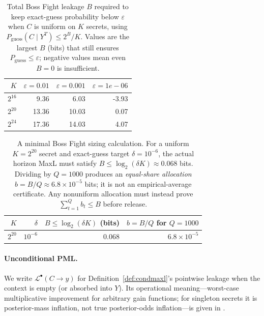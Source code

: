 \documentclass[11pt]{article}
\newcommand{\PML}{\mathcal{L}^{\bullet}}
\newcommand{\logtwo}{\log_2}
\begin{document}
\begin{table}[t]
\centering
\caption{Total Boss Fight leakage $B$ required to keep exact-guess probability below $\varepsilon$ when $C$ is uniform on $K$ secrets, using $P_{\mathrm{guess}}(C\mid Y^{T})\le 2^{B}/K$. Values are the largest $B$ (bits) that still ensures $P_{\mathrm{guess}}\le \varepsilon$; negative values mean even $B=0$ is insufficient.}
\label{tab:identification-targets}
\begin{tabular}{r r r r}
\toprule
$K$ & $\varepsilon=0.01$ & $\varepsilon=0.001$ & $\varepsilon=1e-06$\\
\midrule
$2^{16}$ & 9.36 & 6.03 & -3.93 \\
$2^{20}$ & 13.36 & 10.03 & 0.07 \\
$2^{24}$ & 17.36 & 14.03 & 4.07 \\
\bottomrule
\end{tabular}
\end{table}


\begin{table}[t]
\centering
\caption{A minimal Boss Fight sizing calculation. For a uniform $K=2^{20}$ secret and exact-guess target $\delta=10^{-6}$, the actual horizon MaxL must satisfy $B\le \logtwo(\delta K)\approx 0.068$ bits. Dividing by $Q=1000$ produces an \emph{equal-share allocation} $b=B/Q\approx 6.8\times 10^{-5}$ bits; it is not an empirical-average certificate. Any nonuniform allocation must instead prove $\sum_{t=1}^{Q} b_t\le B$ before release.}
\label{tab:window-example}
\begin{tabular}{rrrr}
\toprule
$K$ & $\delta$ & $B\le \logtwo(\delta K)$ (bits) & $b=B/Q$ for $Q{=}1000$ \\
\midrule
$2^{20}$ & $10^{-6}$ & $0.068$ & $6.8\times 10^{-5}$ \\
\bottomrule
\end{tabular}
\end{table}




\paragraph{Unconditional PML.}
We write $\PML(C\!\to\!y)$ for Definition~\ref{def:condmaxl}'s pointwise leakage when the context is empty (or absorbed into $Y$). Its operational meaning---worst-case multiplicative improvement for arbitrary gain functions; for singleton secrets it is posterior-mass inflation, not true posterior-odds inflation---is given in \cite{saeidian2023pml,saeidian2025rethinking}.
\end{document}

